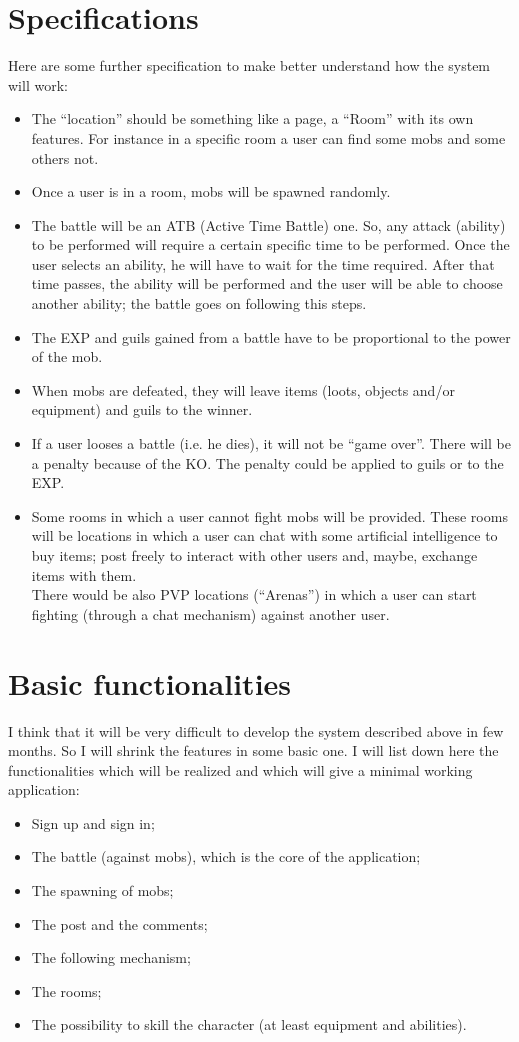 	\section{Specifications}
		Here are some further specification to make better understand how the system will work:
		\begin{itemize}
			\item The ``location'' should be something like a \Facebook{} page, a ``Room'' with its own features. For instance in a specific room a user can find some mobs and some others not.
			\item Once a user is in a room, mobs will be spawned randomly.
			\item The battle will be an ATB (Active Time Battle) one. So, any attack (ability) to be performed will require a certain specific time to be performed. Once the user selects an ability, he will have to wait for the time required. After that time passes, the ability will be performed and the user will be able to choose another ability; the battle goes on following this steps.
			\item The EXP and guils gained from a battle have to be proportional to the power of the mob.
			\item When mobs are defeated, they will leave items (loots, objects and/or equipment) and guils to the winner.
			\item If a user looses a battle (i.e. he dies), it will not be ``game over''. There will be a penalty because of the KO. The penalty could be applied to guils or to the EXP.
			\item Some rooms in which a user cannot fight mobs will be provided. These rooms will be locations in which a user can chat with some artificial intelligence to buy items; post freely to interact with other users and, maybe, exchange items with them.\\
			There would be also PVP locations (``Arenas'') in which a user can start fighting (through a chat mechanism) against another user.
		\end{itemize}

	\section{Basic functionalities}
	I think that it will be very difficult to develop the system described above in few months. So I will shrink the features in some basic one. I will list down here the functionalities which will be realized and which will give a minimal working application:
	\begin{itemize}
		\item Sign up and sign in;
	 	\item The battle (against mobs), which is the core of the application;
	 	\item The spawning of mobs;
	 	\item The post and the comments;
	 	\item The following mechanism;
	 	\item The rooms;
	 	\item The possibility to skill the character (at least equipment and abilities).
	\end{itemize} 